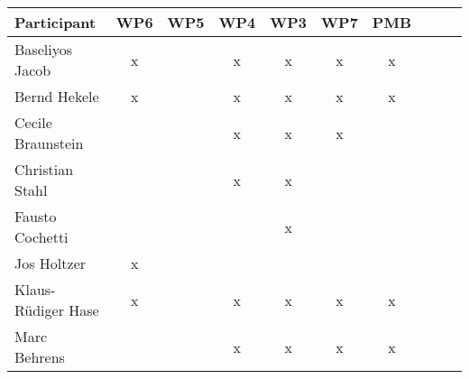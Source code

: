 \documentclass[a4paper, 11pt]{article}
\begin{document}
\begin{tabular}{|l|c|c|c||c|c|c||c|c|c|}
\hline
\textbf{Participant} & \textbf{WP6} &  \textbf{WP5} & \textbf{WP4}&  \textbf{WP3} & \textbf{WP7}&  \textbf{PMB} \\\hline
Baseliyos Jacob      & x &   & x & x & x & x \\\hline 
Bernd Hekele         & x &   & x & x & x & x \\\hline
Cecile Braunstein    &   &   & x & x & x &   \\\hline
Christian Stahl      &   &   & x & x &   &   \\\hline
Fausto Cochetti      &   &   &   & x &   &   \\\hline
Jos Holtzer         & x &   &   &   &   &   \\\hline
Klaus-R\"udiger Hase & x &   & x & x & x & x \\\hline
Marc Behrens         &   &   & x & x & x & x \\\hline

\end{tabular}
\end{document}
